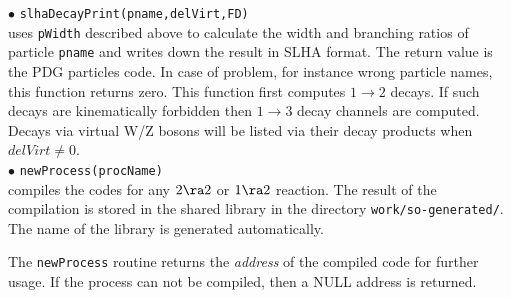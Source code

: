 \documentclass[12pt,a4paper]{article}
\begin{document}
%
\noindent
$\bullet$ \verb|slhaDecayPrint(pname,delVirt,FD)|\\
uses \verb|pWidth| described above to calculate the width and branching ratios of particle \verb|pname| and writes down the result
in SLHA format. The return value is the PDG particles code. In case of problem, for
instance wrong particle names, this function returns zero. This function
first computes $1\to2$  decays. If such decays are kinematically
forbidden then $1\to3$ decay channels are computed. Decays via 
virtual W/Z bosons will be listed via their decay products when $delVirt \ne 0$.\\[2mm]
%
\noindent
$\bullet$ \verb|newProcess(procName)|\\
compiles the  codes for any $2\ra 2$ or  $1\ra 2$  reaction.
The result of the compilation is stored in the  shared library  in the directory \verb|work/so-generated/|. The name of the library is generated
automatically.

The \verb|newProcess| routine returns the
{\it address} of the compiled code for further usage.   If the
process can not be compiled, then a NULL address is
returned. 
\end{document}
